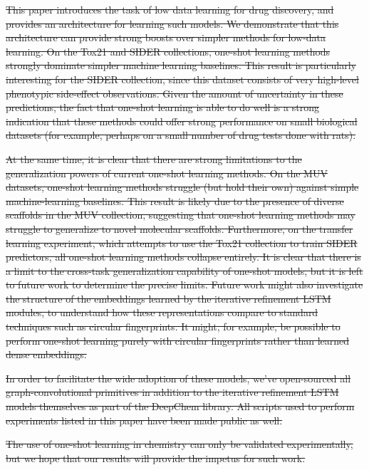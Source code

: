 \documentclass[journal=jacsat,manuscript=article]{achemso}
\providecommand{\DIFdeltex}[1]{{\protect\color{red}\sout{#1}}}                      %
\providecommand{\DIFdel}[1]{\texorpdfstring{\DIFdeltex{#1}}{}} %
\begin{document}
\DIFdel{This paper introduces the task of low data learning for drug discovery, and provides an architecture for learning such models. We demonstrate that this architecture can provide strong boosts over simpler methods for low-data learning. On the Tox21 and SIDER collections, one-shot learning methods strongly dominate simpler machine learning baselines. This result is particularly interesting for the SIDER collection, since this dataset consists of very high-level phenotypic side-effect observations. Given the amount of uncertainty in these predictions, the fact that one-shot learning is able to do well is a strong indication that these methods could offer strong performance on small biological datasets (for example, perhaps on a small number of drug tests done with rats).
}%

\DIFdel{At the same time, it is clear that there are strong limitations to the generalization powers of current one-shot learning methods. On the MUV datasets, one-shot learning methods struggle (but hold their own) against simple machine-learning baselines. This result is likely due to the presence of diverse scaffolds in the MUV collection, suggesting that one-shot learning methods may struggle to generalize to novel molecular scaffolds. Furthermore, on the transfer learning experiment, which attempts to use the Tox21 collection to train SIDER predictors, all one-shot learning methods collapse entirely. It is clear that there is a limit to the cross-task generalization capability of one-shot models, but it is left to future work to determine the precise limits. Future work might also investigate the structure of the embeddings learned by the iterative refinement LSTM modules, to understand how these representations compare to standard techniques such as circular fingerprints. It might, for example, be possible to perform one-shot learning purely with circular fingerprints rather than learned dense embeddings.
}%

\DIFdel{In order to facilitate the wide adoption of these models, we've open-sourced all graph-convolutional primitives in addition to the iterative refinement LSTM models themselves as part of the DeepChem library. All scripts used to perform experiments listed in this paper have been made public as well.
}%

\DIFdel{The use of one-shot learning in chemistry can only be validated experimentally, but we hope that our results will provide the impetus for such work.
}%
\end{document}
